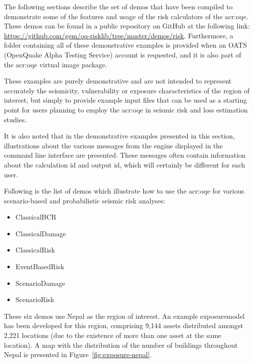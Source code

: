 The following sections describe the set of demos that have been compiled to
demonstrate some of the features and usage of the risk calculators of the
\glsdesc{acr:oqe}. These demos can be found in a public repository on GitHub at
the following link:
\href{https://github.com/gem/oq-risklib/tree/master/demos/risk}
{https://github.com/gem/oq-risklib/tree/master/demos/risk}.
Furthermore, a folder containing all of these
demonstrative examples is provided when an OATS (OpenQuake Alpha Testing
Service) account is requested, and it is also part of the \gls{acr:oqe}
virtual image package.

These examples are purely demonstrative and are not intended to represent
accurately the seismicity, vulnerability or exposure characteristics of the
region of interest, but simply to provide example input files that can be used
as a starting point for users planning to employ the \glsdesc{acr:oqe} in seismic
risk and loss estimation studies.

It is also noted that in the demonstrative examples presented in this section,
illustrations about the various messages from the engine displayed in the
command line interface are presented. These messages often contain information
about the calculation id and output id, which will certainly be different for
each user.

Following is the list of demos which illustrate how to use the \gls{acr:oqe} for
various scenario-based and probabilistic seismic risk analyses:

\begin{itemize}

    \item ClassicalBCR
	\item ClassicalDamage
    \item ClassicalRisk
    \item EventBasedRisk
    \item ScenarioDamage
    \item ScenarioRisk

\end{itemize}

These six demos use Nepal as the region of interest. An example
\gls{exposuremodel} has been developed for this region, comprising 9,144
assets distributed amongst 2,221 locations (due to the existence of more than
one \gls{asset} at the same location). A map with the distribution of the
number of buildings throughout Nepal is presented in Figure~\ref{fig:exposure-nepal}.

